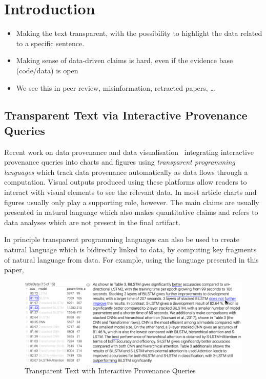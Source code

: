 \section{Introduction}

\lstset{
    aboveskip=-7pt,
    belowskip=-8.5pt,
    xleftmargin=0pt,
    xrightmargin=0pt
}

\begin{itemize}
    \item Making the text transparent, with the possibility to highlight the data related to a specific sentence.
    \item Making sense of data-driven claims is hard, even if the evidence base (code/data) is open
    \item We see this in peer review, misinformation, retracted papers, …
\end{itemize}

\subsection{Transparent Text via Interactive Provenance Queries}

Recent work on data provenance and data visualisation~\citep{psallidas18smoke,perera22,bond25} integrating
interactive provenance queries into charts and figures using \emph{transparent programming languages} which
track data provenance automatically as data flows through a computation. Visual outputs produced using these
platforms allow readers to interact with visual elements to see the relevant data. In most article charts and
figures usually only play a supporting role, however. The main claims are usually presented in natural
language which also makes quantitative claims and refers to data analyses which are not present in the final
artifact.

In principle transparent programming languages can also be used to create natural language which is bidirectly
linked to data, by computing key fragments of natural language from data. For example, using the language
presented in this paper,

\begin{figure}[h]
    \centering
    \includegraphics[width=\linewidth]{fig/scigen-1805.02474v1-10-with-pointer.png}
    \caption{Transparent Text with Interactive Provenance Queries}\label{fig:scigen-example-website}
\end{figure}

